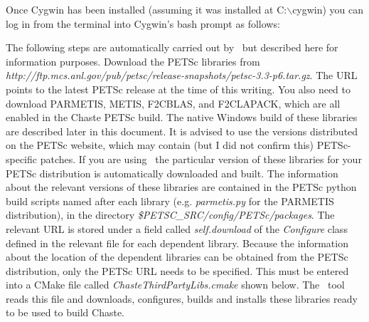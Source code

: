 \documentclass[10pt,a4paper]{article}
\newcommand{\bs}{\ensuremath{\backslash}}
\begin{document}
Once Cygwin has been installed (assuming it was installed at C:\bs cygwin) you
can log in from the terminal into Cygwin's bash prompt as follows:

\begin{center}
\declaration{
C:\bs$>$ \ C:\bs cygwin\bs Cygwin {-}-login
}
\end{center}




The following steps are automatically carried out by \chastelibbuilder\ but
described here for information purposes. Download the PETSc libraries from
\textit{http://ftp.mcs.anl.gov/pub/petsc/release-snapshots/petsc-3.3-p6.tar.gz}.
The URL points to the latest PETSc release at the time of this writing. You also
need to download PARMETIS, METIS, F2CBLAS, and F2CLAPACK, which are all enabled
in the Chaste PETSc build. The native Windows build of these libraries are
described later in this document. It is advised to use the versions distributed
on the PETSc website, which may contain (but I did not confirm this)
PETSc-specific patches. If you are using \chastelibbuilder\ the particular
version of these libraries for your PETSc distribution is automatically
downloaded and built. The information about the relevant versions of these
libraries are contained in the PETSc python build scripts named after each
library (e.g. \textit{parmetis.py} for the PARMETIS distribution), in the
directory \textit{\$PETSC\_SRC/config/PETSc/packages}. The relevant URL is
stored under a field called \textit{self.download} of the \textit{Configure}
class defined in the relevant file for each dependent library. Because the
information about the location of the dependent libraries can be obtained from
the PETSc distribution, only the PETSc URL needs to be specified. This must be
entered into a CMake file called \textit{ChasteThirdPartyLibs.cmake} shown
below. The \chastelibbuilder\ tool reads this file and downloads, configures,
builds and installs these libraries ready to be used to build Chaste.
\end{document}
